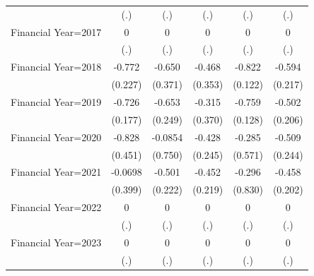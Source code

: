 \begin{table}[htbp]
\begin{tabular}{l*{5}{c}}
                    &         (.)         &         (.)         &         (.)         &         (.)         &         (.)         \\
\addlinespace
Financial Year=2017 &           0         &           0         &           0         &           0         &           0         \\
                    &         (.)         &         (.)         &         (.)         &         (.)         &         (.)         \\
\addlinespace
Financial Year=2018 &      -0.772\sym{***}&      -0.650\sym{*}  &      -0.468         &      -0.822\sym{***}&      -0.594\sym{***}\\
                    &     (0.227)         &     (0.371)         &     (0.353)         &     (0.122)         &     (0.217)         \\
\addlinespace
Financial Year=2019 &      -0.726\sym{***}&      -0.653\sym{***}&      -0.315         &      -0.759\sym{***}&      -0.502\sym{**} \\
                    &     (0.177)         &     (0.249)         &     (0.370)         &     (0.128)         &     (0.206)         \\
\addlinespace
Financial Year=2020 &      -0.828\sym{*}  &     -0.0854         &      -0.428\sym{*}  &      -0.285         &      -0.509\sym{**} \\
                    &     (0.451)         &     (0.750)         &     (0.245)         &     (0.571)         &     (0.244)         \\
\addlinespace
Financial Year=2021 &     -0.0698         &      -0.501\sym{**} &      -0.452\sym{**} &      -0.296         &      -0.458\sym{**} \\
                    &     (0.399)         &     (0.222)         &     (0.219)         &     (0.830)         &     (0.202)         \\
\addlinespace
Financial Year=2022 &           0         &           0         &           0         &           0         &           0         \\
                    &         (.)         &         (.)         &         (.)         &         (.)         &         (.)         \\
\addlinespace
Financial Year=2023 &           0         &           0         &           0         &           0         &           0         \\
                    &         (.)         &         (.)         &         (.)         &         (.)         &         (.)         \\

\end{tabular}
\end{table}
